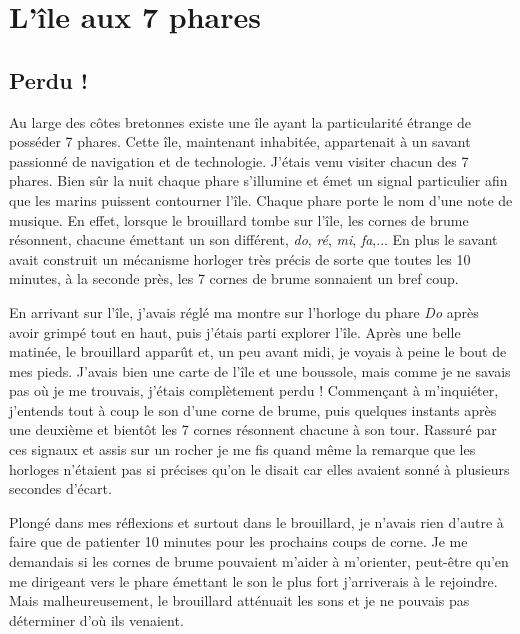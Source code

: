\documentclass[class=report,crop=false]{standalone}
\begin{document}


\section{L'île aux 7 phares}



\subsection{Perdu !}

Au large des côtes bretonnes existe une île ayant la particularité étrange 
de posséder 7 phares. Cette île, maintenant inhabitée, appartenait à un 
savant passionné de navigation et de technologie. J'étais venu visiter 
chacun des 7 phares. Bien sûr la nuit chaque phare s'illumine et émet un signal
particulier afin que les marins puissent contourner l'île. Chaque phare porte 
le nom d'une note de musique. En effet, lorsque
le brouillard tombe sur l'île, les cornes de brume résonnent, chacune émettant 
un son différent, \emph{do}, \emph{ré}, \emph{mi}, \emph{fa},...
En plus le savant avait construit un mécanisme horloger très précis de sorte que toutes les 
10 minutes, à la seconde près, les 7 cornes de brume sonnaient un bref coup.



En arrivant sur l'île, j'avais réglé ma montre sur l'horloge du phare \emph{Do} après avoir grimpé tout en haut,
puis j'étais parti explorer l'île. Après une belle matinée, le brouillard apparût et, 
un peu avant midi, je voyais à peine le bout de mes pieds. J'avais bien une carte de l'île
et une boussole, mais comme je ne savais pas où je me trouvais, j'étais complètement perdu !
Commençant à m’inquiéter, j'entends tout à coup le son d'une corne de brume, puis quelques instants
après une deuxième et bientôt les 7 cornes résonnent chacune à son tour. Rassuré par ces signaux et 
assis sur un rocher je me fis quand même la remarque que les horloges n'étaient 
pas si précises qu'on le disait car elles avaient sonné à plusieurs secondes d'écart.

Plongé dans mes réflexions et surtout dans le brouillard, je n'avais rien d'autre à faire
que de patienter 10 minutes pour les prochains coups de corne. Je me demandais si les 
cornes de brume pouvaient m'aider à m'orienter, peut-être qu'en me dirigeant vers le phare 
émettant le son le plus fort j'arriverais  à le rejoindre. Mais malheureusement, le brouillard
atténuait les sons et je ne pouvais pas déterminer d'où ils venaient.
\end{document}

